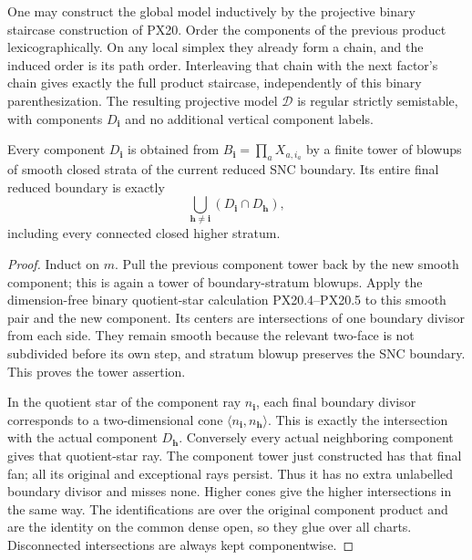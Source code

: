 One may construct the global model inductively by the projective
binary staircase construction of PX20. Order the components of
the previous product lexicographically. On any local simplex
they already form a chain, and the induced order is its path
order. Interleaving that chain with the next factor's chain gives
exactly the full product staircase, independently of this binary
parenthesization. The resulting projective model $\mathcal D$
is regular strictly semistable, with components $D_{\mathbf i}$
and no additional vertical component labels.

\begin{lemma}
\label{r20dp:towers}
Every component $D_{\mathbf i}$ is obtained from
$B_{\mathbf i}=\prod_a X_{a,i_a}$ by a finite tower of blowups
of smooth closed strata of the current reduced SNC boundary.
Its entire final reduced boundary is exactly
\[
       \bigcup_{\mathbf h\ne\mathbf i}
                      (D_{\mathbf i}\cap D_{\mathbf h}),
 \tag{DP20.2}
\]
including every connected closed higher stratum.
\end{lemma}

\begin{proof}
Induct on $m$. Pull the previous component tower back by the
new smooth component; this is again a tower of boundary-stratum
blowups. Apply the dimension-free binary quotient-star calculation
PX20.4--PX20.5 to this smooth pair and the new component. Its
centers are intersections of one boundary divisor from each
side. They remain smooth because the relevant two-face is not
subdivided before its own step, and stratum blowup preserves
the SNC boundary. This proves the tower assertion.

In the quotient star of the component ray $n_{\mathbf i}$,
each final boundary divisor corresponds to a two-dimensional
cone $\langle n_{\mathbf i},n_{\mathbf h}\rangle$.
This is exactly the intersection with the actual component
$D_{\mathbf h}$. Conversely every actual neighboring component
gives that quotient-star ray. The component tower just constructed
has that final fan; all its original and exceptional rays persist.
Thus it has no extra unlabelled boundary divisor and misses none.
Higher cones give the higher intersections in the same way.
The identifications are over the original component product and
are the identity on the common dense open, so they glue over all
charts. Disconnected intersections are always kept componentwise.
\end{proof}

